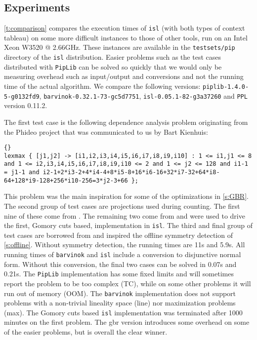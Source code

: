 \subsection{Experiments}

\autoref{t:comparison} compares the execution times of {\tt isl}
(with both types of context tableau)
on some more difficult instances to those of other tools,
run on an Intel Xeon W3520 @ 2.66GHz.
These instances are available in the \lstinline{testsets/pip} directory
of the {\tt isl} distribution.
Easier problems such as the
test cases distributed with {\tt Pip\-Lib} can be solved so quickly
that we would only be measuring overhead such as input/output and conversions
and not the running time of the actual algorithm.
We compare the following versions:
{\tt piplib-1.4.0-5-g0132fd9},
{\tt barvinok-0.32.1-73-gc5d7751},
{\tt isl-0.05.1-82-g3a37260}
and {\tt PPL} version 0.11.2.

The first test case is the following dependence analysis problem
originating from the Phideo project \parencite{Verhaegh1995PhD}
that was communicated to us by Bart Kienhuis:
\begin{lstlisting}[flexiblecolumns=true,breaklines=true]{}
lexmax { [j1,j2] -> [i1,i2,i3,i4,i5,i6,i7,i8,i9,i10] : 1 <= i1,j1 <= 8 and 1 <= i2,i3,i4,i5,i6,i7,i8,i9,i10 <= 2 and 1 <= j2 <= 128 and i1-1 = j1-1 and i2-1+2*i3-2+4*i4-4+8*i5-8+16*i6-16+32*i7-32+64*i8-64+128*i9-128+256*i10-256=3*j2-3+66 };
\end{lstlisting}
This problem was the main inspiration
for some of the optimizations in \autoref{s:GBR}.
The second group of test cases are projections used during counting.
The first nine of these come from \textcite{Seghir2006minimizing}.
The remaining two come from \textcite{Verdoolaege2005experiences} and
were used to drive the first, Gomory cuts based, implementation
in {\tt isl}.
The third and final group of test cases are borrowed from
\textcite{Bygde2010licentiate} and inspired the offline symmetry detection
of \autoref{s:offline}.  Without symmetry detection, the running times
are 11s and 5.9s.
All running times of {\tt barvinok} and {\tt isl} include a conversion
to disjunctive normal form.  Without this conversion, the final two
cases can be solved in 0.07s and 0.21s.
The {\tt PipLib} implementation has some fixed limits and will
sometimes report the problem to be too complex (TC), while on some other
problems it will run out of memory (OOM).
The {\tt barvinok} implementation does not support problems
with a non-trivial lineality space (line) nor maximization problems (max).
The Gomory cuts based {\tt isl} implementation was terminated after 1000
minutes on the first problem.  The gbr version introduces some
overhead on some of the easier problems, but is overall the clear winner.

